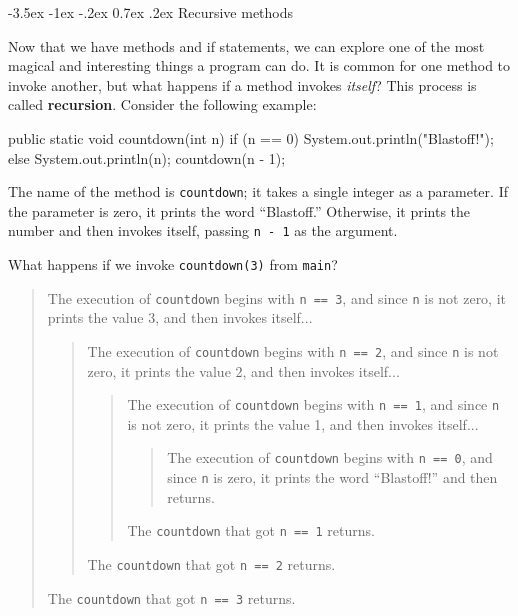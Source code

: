\documentclass[12pt]{book}
\makeatletter
\theoremstyle{exercise}
\newcommand{\java}[1]{\verb"#1"}
\renewcommand{\section}{\@startsection{section}{1}{\z@}%
    {-3.5ex \@plus -1ex \@minus -.2ex}%
    {0.7ex \@plus.2ex}%
    {\normalfont\Large\bfseries}}
\newcommand{\java}[1]{\lstinline{#1}} %
\makeatother
\begin{document}
\section{Recursive methods}
\label{recursion}


Now that we have methods and if statements, we can explore one of the most magical and interesting things a program can do.
It is common for one method to invoke another, but what happens if a method invokes {\em itself}?
This process is called {\bf recursion}.
Consider the following example:

\begin{code}
    public static void countdown(int n) {
        if (n == 0) {
            System.out.println("Blastoff!");
        } else {
            System.out.println(n);
            countdown(n - 1);
        }
    }
\end{code}

The name of the method is \java{countdown}; it takes a single integer as a parameter.
If the parameter is zero, it prints the word ``Blastoff.''
Otherwise, it prints the number and then invokes itself, passing \java{n - 1} as the argument.

What happens if we invoke \java{countdown(3)} from \java{main}?

\vspace{-1ex}
\begin{quote}
The execution of \java{countdown} begins with \java{n == 3}, and since \java{n} is not zero, it prints the value 3, and then invokes itself...
\begin{quote}
The execution of \java{countdown} begins with \java{n == 2}, and since \java{n} is not zero, it prints the value 2, and then invokes itself...
\begin{quote}
The execution of \java{countdown} begins with \java{n == 1}, and since \java{n} is not zero, it prints the value 1, and then invokes itself...
\begin{quote}
The execution of \java{countdown} begins with \java{n == 0}, and since \java{n} is zero, it prints the word ``Blastoff!'' and then returns.
\end{quote}
The \java{countdown} that got \java{n == 1} returns.
\end{quote}
The \java{countdown} that got \java{n == 2} returns.
\end{quote}
The \java{countdown} that got \java{n == 3} returns.
\end{quote}
\vspace{-1ex}
\end{document}

